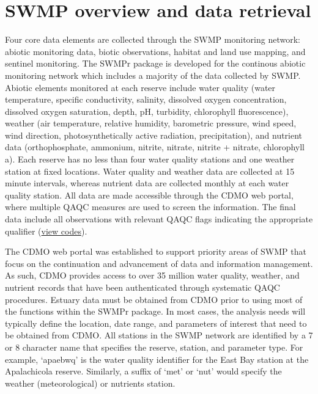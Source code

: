 \documentclass[10pt,letterpaper]{article}\usepackage[]{graphicx}\usepackage[]{color}
\begin{document}
\section*{SWMP overview and data retrieval}

Four core data elements are collected through the \ac{SWMP} monitoring network: abiotic monitoring data, biotic observations, habitat and land use mapping, and sentinel monitoring.  The SWMPr package is developed for the continous abiotic monitoring network which includes a majority of the data collected by \ac{SWMP}.  Abiotic elements monitored at each reserve include water quality (water temperature, specific conductivity, salinity, dissolved oxygen concentration, dissolved oxygen saturation, depth, pH, turbidity, chlorophyll fluorescence), weather (air temperature, relative humidity, barometric pressure, wind speed, wind direction, photosynthetically active radiation, precipitation), and nutrient data (orthophosphate, ammonium, nitrite, nitrate, nitrite + nitrate, chlorophyll a).  Each reserve has no less than four water quality stations and one weather station at fixed locations.  Water quality and weather data are collected at 15 minute intervals, whereas nutrient data are collected monthly at each water quality station.  All data are made accessible through the \ac{CDMO} web portal, where multiple \ac{QAQC} measures are used to screen the information.  The final data include all observations with relevant \ac{QAQC} flags indicating the appropriate qualifier (\href{http://cdmo.baruch.sc.edu/data/qaqc.cfm}{view codes}).

The \ac{CDMO} web portal was established to support priority areas of \ac{SWMP} that focus on the continuation and advancement of data and information management.  As such, \ac{CDMO} provides access to over 35 million water quality, weather, and nutrient records that have been authenticated through systematic \ac{QAQC} procedures.  Estuary data must be obtained from \ac{CDMO} prior to using most of the functions within the SWMPr package.  In most cases, the analysis needs will typically define the location, date range, and parameters of interest that need to be obtained from \ac{CDMO}.  All stations in the \ac{SWMP} network are identified by a 7 or 8 character name that specifies the reserve, station, and parameter type.  For example, `apaebwq' is the water quality identifier for the East Bay station at the Apalachicola reserve.  Similarly, a suffix of `met' or `nut' would specify the weather (meteorological) or nutrients station.  
\end{document}
